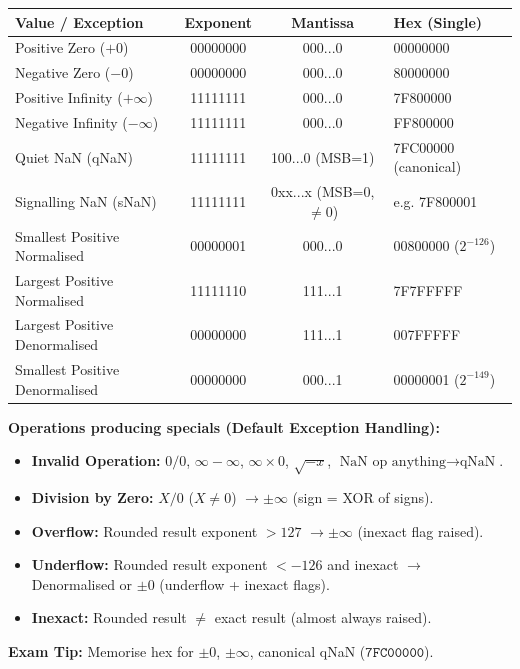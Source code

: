 \documentclass[11pt]{article}
\begin{document}
\begin{propriete}
\begin{center}
    \begin{tabular}{|l|c|c|l|}
        \hline
        \textbf{Value / Exception} & \textbf{Exponent} & \textbf{Mantissa} & \textbf{Hex (Single)} \\ \hline
        Positive Zero ($+0$) & 00000000 & 000...0 & 00000000 \\
        Negative Zero ($-0$) & 00000000 & 000...0 & 80000000 \\
        Positive Infinity ($+\infty$) & 11111111 & 000...0 & 7F800000 \\
        Negative Infinity ($-\infty$) & 11111111 & 000...0 & FF800000 \\
        Quiet NaN (qNaN) & 11111111 & 100...0 (MSB=1) & 7FC00000 (canonical) \\
        Signalling NaN (sNaN) & 11111111 & 0xx...x (MSB=0, $\neq 0$) & e.g. 7F800001 \\
        Smallest Positive Normalised & 00000001 & 000...0 & 00800000 ($2^{-126}$) \\
        Largest Positive Normalised & 11111110 & 111...1 & 7F7FFFFF \\
        Largest Positive Denormalised & 00000000 & 111...1 & 007FFFFF \\
        Smallest Positive Denormalised & 00000000 & 000...1 & 00000001 ($2^{-149}$) \\ \hline
    \end{tabular}
\end{center}
\textbf{Operations producing specials (Default Exception Handling):}
\begin{itemize}
    \item \textbf{Invalid Operation:} $0/0$, $\infty-\infty$, $\infty\times0$, $\sqrt{-x}$, $\text{NaN op anything} \to \text{qNaN}$.
    \item \textbf{Division by Zero:} $X/0$ ($X \neq 0$) $\to \pm\infty$ (sign = XOR of signs).
    \item \textbf{Overflow:} Rounded result exponent $> 127$ $\to \pm\infty$ (inexact flag raised).
    \item \textbf{Underflow:} Rounded result exponent $< -126$ and inexact $\to$ Denormalised or $\pm 0$ (underflow + inexact flags).
    \item \textbf{Inexact:} Rounded result $\neq$ exact result (almost always raised).
\end{itemize}
\textbf{Exam Tip:} Memorise hex for $\pm 0$, $\pm \infty$, canonical qNaN ($\mathtt{7FC00000}$).
\end{propriete}
\end{document}
